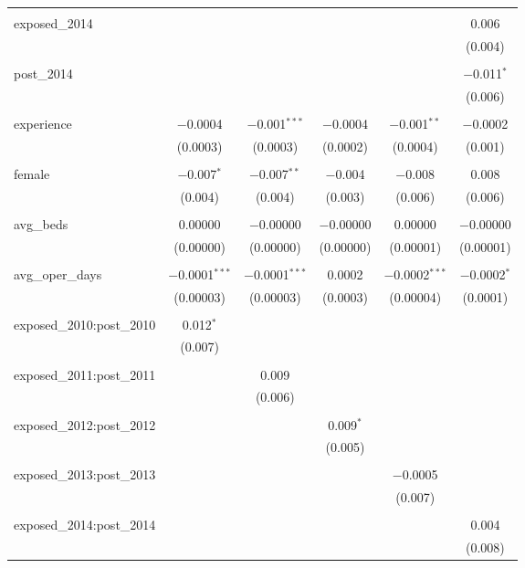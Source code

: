 \begin{table}[!htbp]
\begin{adjustbox}{width=\textwidth}
\begin{tabular}{@{\extracolsep{5pt}}lccccc}
  & & & & & \\ 
 exposed\_2014 &  &  &  &  & 0.006 \\ 
  &  &  &  &  & (0.004) \\ 
  & & & & & \\ 
 post\_2014 &  &  &  &  & $-$0.011$^{*}$ \\ 
  &  &  &  &  & (0.006) \\ 
  & & & & & \\ 
 experience & $-$0.0004 & $-$0.001$^{***}$ & $-$0.0004 & $-$0.001$^{**}$ & $-$0.0002 \\ 
  & (0.0003) & (0.0003) & (0.0002) & (0.0004) & (0.001) \\ 
  & & & & & \\ 
 female & $-$0.007$^{*}$ & $-$0.007$^{**}$ & $-$0.004 & $-$0.008 & 0.008 \\ 
  & (0.004) & (0.004) & (0.003) & (0.006) & (0.006) \\ 
  & & & & & \\ 
 avg\_beds & 0.00000 & $-$0.00000 & $-$0.00000 & 0.00000 & $-$0.00000 \\ 
  & (0.00000) & (0.00000) & (0.00000) & (0.00001) & (0.00001) \\ 
  & & & & & \\ 
 avg\_oper\_days & $-$0.0001$^{***}$ & $-$0.0001$^{***}$ & 0.0002 & $-$0.0002$^{***}$ & $-$0.0002$^{*}$ \\ 
  & (0.00003) & (0.00003) & (0.0003) & (0.00004) & (0.0001) \\ 
  & & & & & \\ 
 exposed\_2010:post\_2010 & 0.012$^{*}$ &  &  &  &  \\ 
  & (0.007) &  &  &  &  \\ 
  & & & & & \\ 
 exposed\_2011:post\_2011 &  & 0.009 &  &  &  \\ 
  &  & (0.006) &  &  &  \\ 
  & & & & & \\ 
 exposed\_2012:post\_2012 &  &  & 0.009$^{*}$ &  &  \\ 
  &  &  & (0.005) &  &  \\ 
  & & & & & \\ 
 exposed\_2013:post\_2013 &  &  &  & $-$0.0005 &  \\ 
  &  &  &  & (0.007) &  \\ 
  & & & & & \\ 
 exposed\_2014:post\_2014 &  &  &  &  & 0.004 \\ 
  &  &  &  &  & (0.008) \\ 

\end{tabular}
\end{adjustbox}
\end{table}
